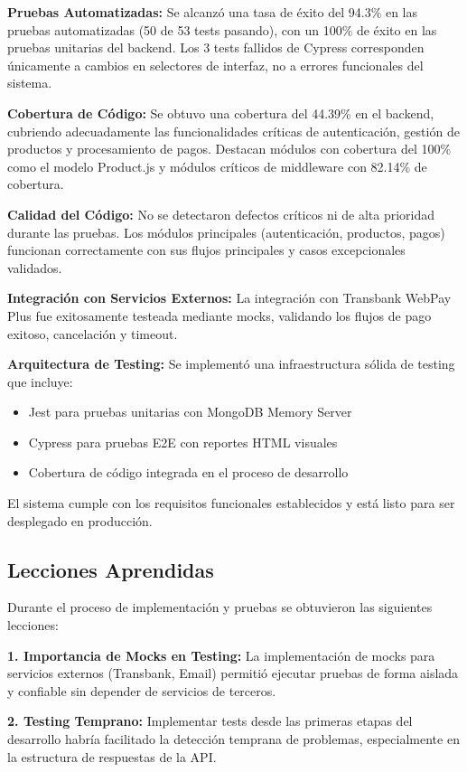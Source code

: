 \documentclass[12pt,a4paper]{article}
\begin{document}
\textbf{Pruebas Automatizadas:} Se alcanzó una tasa de éxito del 94.3\% en las pruebas automatizadas (50 de 53 tests pasando), con un 100\% de éxito en las pruebas unitarias del backend. Los 3 tests fallidos de Cypress corresponden únicamente a cambios en selectores de interfaz, no a errores funcionales del sistema.

\textbf{Cobertura de Código:} Se obtuvo una cobertura del 44.39\% en el backend, cubriendo adecuadamente las funcionalidades críticas de autenticación, gestión de productos y procesamiento de pagos. Destacan módulos con cobertura del 100\% como el modelo Product.js y módulos críticos de middleware con 82.14\% de cobertura.

\textbf{Calidad del Código:} No se detectaron defectos críticos ni de alta prioridad durante las pruebas. Los módulos principales (autenticación, productos, pagos) funcionan correctamente con sus flujos principales y casos excepcionales validados.

\textbf{Integración con Servicios Externos:} La integración con Transbank WebPay Plus fue exitosamente testeada mediante mocks, validando los flujos de pago exitoso, cancelación y timeout.

\textbf{Arquitectura de Testing:} Se implementó una infraestructura sólida de testing que incluye:
\begin{itemize}
    \item Jest para pruebas unitarias con MongoDB Memory Server
    \item Cypress para pruebas E2E con reportes HTML visuales
    \item Cobertura de código integrada en el proceso de desarrollo
\end{itemize}

El sistema cumple con los requisitos funcionales establecidos y está listo para ser desplegado en producción.

\subsection{Lecciones Aprendidas}

Durante el proceso de implementación y pruebas se obtuvieron las siguientes lecciones:

\textbf{1. Importancia de Mocks en Testing:} La implementación de mocks para servicios externos (Transbank, Email) permitió ejecutar pruebas de forma aislada y confiable sin depender de servicios de terceros.

\textbf{2. Testing Temprano:} Implementar tests desde las primeras etapas del desarrollo habría facilitado la detección temprana de problemas, especialmente en la estructura de respuestas de la API.
\end{document}
